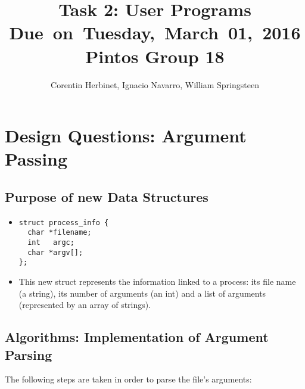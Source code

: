 \documentclass{article}
\title{
\vspace{2in}
\textmd{\textbf{Task 2: User Programs}}\\
\normalsize\vspace{0.1in}\small{Due\ on\ Tuesday,\ March\ 01,\ 2016}\\
\vspace{0.1in}\large{\textbf{Pintos Group 18}}
\vspace{3in}
}
\author{Corentin Herbinet, Ignacio Navarro, William Springsteen}
\date{}
\renewcommand{\_}{\char`_}
\begin{document}
\maketitle
\newpage

\section{Design Questions: Argument Passing}

\subsection{Purpose of new Data Structures}

\begin{itemize}
\item \begin{lstlisting}
struct process_info {
  char *filename;
  int   argc;
  char *argv[];
};
\end{lstlisting}

\item This new struct represents the information linked to a process: its file name (a string), its number of arguments (an int) and a list of arguments (represented by an array of strings). 
\end{itemize}


\subsection{Algorithms: Implementation of Argument Parsing}

The following steps are taken in order to parse the file's arguments:
\end{document}
